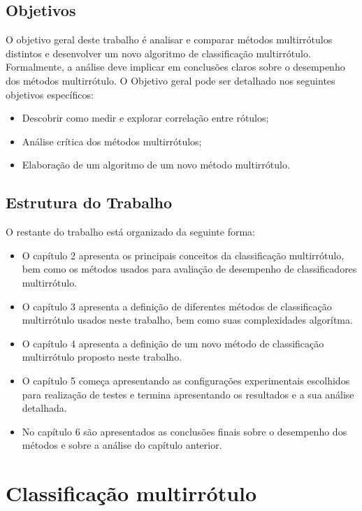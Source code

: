 \section{Objetivos}
O objetivo geral deste trabalho é analisar e comparar métodos multirrótulos distintos e 
desenvolver um novo algoritmo de classificação multirrótulo.
Formalmente, a análise deve implicar em conclusões claros
sobre o desempenho dos métodos multirrótulo.
O Objetivo geral pode ser detalhado nos seguintes objetivos específicos:
\begin{itemize}
 \item Descobrir como medir e explorar correlação entre rótulos;
 \item Análise crítica dos métodos multirrótulos;
 \item Elaboração de um algoritmo de um novo método multirrótulo.
\end{itemize}


\section{Estrutura do Trabalho}
O restante do trabalho está organizado da seguinte forma:
\begin{itemize}
 \item O capítulo 2 apresenta os principais conceitos da classificação multirrótulo, bem como
 os métodos usados para avaliação de desempenho de classificadores multirrótulo.
 \item O capítulo 3 apresenta a definição de diferentes métodos de classificação multirrótulo usados neste trabalho,
 bem como suas complexidades algorítma.
 \item O capítulo 4 apresenta a definição de um novo método de classificação multirrótulo proposto neste trabalho.
 \item O capítulo 5 começa apresentando as configurações experimentais escolhidos para realização de testes e termina
 apresentando os resultados e a sua análise detalhada.
 \item No capítulo 6 são apresentados as conclusões finais sobre o desempenho dos métodos e sobre a análise do capítulo anterior.
\end{itemize}


\chapter{Classificação multirrótulo}

